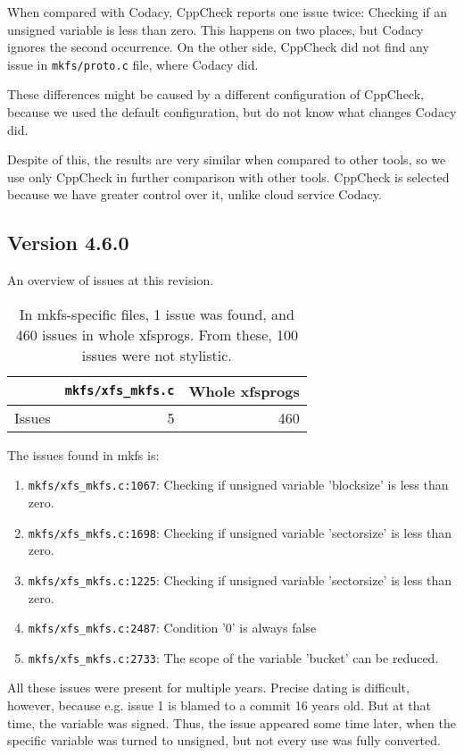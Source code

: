 When compared with Codacy, CppCheck reports one issue twice: Checking if an
unsigned variable is less than zero. This happens on two places, but Codacy
ignores the second occurrence. On the other side, CppCheck did not find any
issue in {\tt mkfs/proto.c} file, where Codacy did.

These differences might be caused by a different configuration of CppCheck,
because we used the default configuration, but do not know what changes
Codacy did.

Despite of this, the results are very similar when compared to other tools,
so we use only CppCheck in further comparison with other tools. CppCheck is
selected because we have greater control over it, unlike cloud service Codacy.


\subsection{Version 4.6.0}
An overview of issues at this revision.
\begin{table}[h]
\begin{tabular}{|l||r||r|}
\hline
& {\tt mkfs/xfs\_mkfs.c} & Whole xfsprogs \\
\hline
Issues & 5 & 460 \\
\hline
\end{tabular}
\caption{In mkfs-specific files, 1 issue was found, and 460 issues in whole
xfsprogs. From these, 100 issues were not stylistic.}
\end{table}

The issues found in mkfs is:
\begin{enumerate}
	\item {\tt mkfs/xfs\_mkfs.c:1067}: Checking if unsigned variable 'blocksize' is less than zero.
	\item {\tt mkfs/xfs\_mkfs.c:1698}: Checking if unsigned variable
		'sectorsize' is less than zero.
	\item {\tt mkfs/xfs\_mkfs.c:1225}: Checking if unsigned variable
		'sectorsize' is less than zero.
	\item {\tt mkfs/xfs\_mkfs.c:2487}: Condition '0' is always false
	\item {\tt mkfs/xfs\_mkfs.c:2733}: The scope of the variable 'bucket' can be reduced.
\end{enumerate}

All these issues were present for multiple years. Precise dating is
difficult, however, because e.g. issue 1 is blamed to a commit 16 years
old. But at that time, the variable was signed. Thus, the issue appeared
some time later, when the specific variable was turned to unsigned, but not
every use was fully converted.

